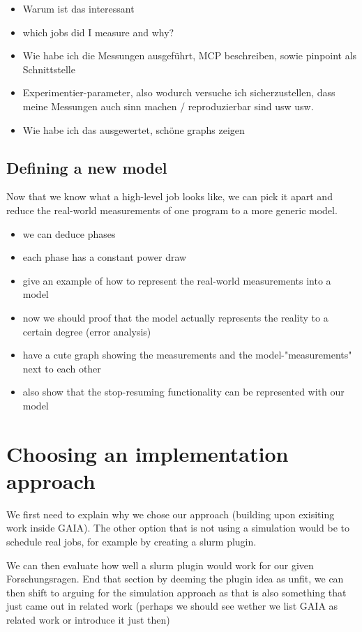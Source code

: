 \begin{itemize}
    \item Warum ist das interessant
    \item which jobs did I measure and why?
    \item Wie habe ich die Messungen ausgeführt, MCP beschreiben, sowie pinpoint als Schnittstelle
    \item Experimentier-parameter, also wodurch versuche ich sicherzustellen, dass meine Messungen auch sinn machen / reproduzierbar sind usw usw.
    \item Wie habe ich das ausgewertet, schöne graphs zeigen
\end{itemize}

\subsection{Defining a new model}

Now that we know what a high-level job looks like, we can pick it apart and reduce the real-world measurements of one program to a more generic model. 

\begin{itemize}
    \item we can deduce phases
    \item each phase has a constant power draw
    \item give an example of how to represent the real-world measurements into a model
    \item now we should proof that the model actually represents the reality to a certain degree (error analysis)
    \item have a cute graph showing the measurements and the model-"measurements" next to each other
    \item also show that the stop-resuming functionality can be represented with our model
\end{itemize}

\section{Choosing an implementation approach}

We first need to explain why we chose our approach (building upon exisiting work inside GAIA). The other option that is not using a simulation would be to schedule real jobs, for example by creating a slurm plugin.

We can then evaluate how well a slurm plugin would work for our given Forschungsragen. End that section by deeming the plugin idea as unfit, we can then shift to arguing for the simulation approach as that is also something that just came out in related work (perhaps we should see wether we list GAIA as related work or introduce it just then)

